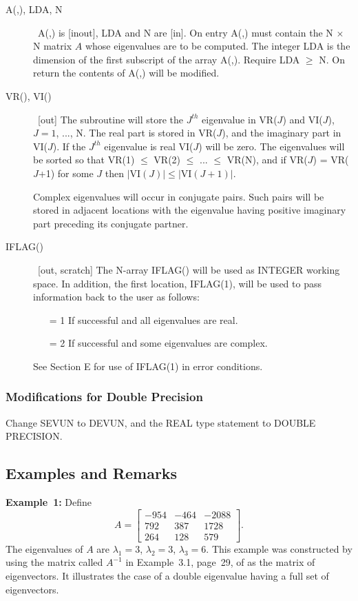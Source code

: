 \documentclass[twoside]{MATH77}
\begin{document}
\begin{description}
\item[A(,), LDA, N]  \ A(,) is [inout], LDA and N are [in]. On entry A(,) must
contain the N $\times $ N matrix $A$ whose eigenvalues are to be computed. The
integer LDA is the dimension of the first subscript of the array A(,).
Require LDA $\geq $ N. On return the contents of A(,) will be modified.

\item[VR(), VI()]  \ [out] The subroutine will store the $J^{th}$ eigenvalue
in VR($J$) and VI($J$), $J =1$, ..., N. The real part is stored in
VR($J$), and
the imaginary part in VI($J$). If the $J^{th}$ eigenvalue is real VI($J$) will
be zero. The eigenvalues will be sorted so that VR(1) $\leq $ VR(2) $\leq $
... $\leq $ VR(N), and if VR($J$) = VR($J$+1) for some $J$ then $|$VI$(J)|
\leq |$VI$(J+1)|.$

Complex eigenvalues will occur in conjugate pairs. Such pairs will be stored
in adjacent locations with the eigenvalue having positive imaginary part
preceding its conjugate partner.

\item[IFLAG()]  \ [out, scratch] The N-array IFLAG() will be used as INTEGER
working space. In addition, the first location, IFLAG(1), will be used to
pass information back to the user as follows:

\begin{itemize}
\item[= 1]  If successful and all eigenvalues are real.

\item[= 2]  If successful and some eigenvalues are complex.
\end{itemize}

See Section E for use of IFLAG(1) in error conditions.
\end{description}

\subsubsection{Modifications for Double Precision}

Change SEVUN to DEVUN, and the REAL type statement to DOUBLE PRECISION.

\subsection{Examples and Remarks}

{\bf Example~1:} Define
\begin{equation*}
A=\left[
\begin{array}{rrr}
-954 & -464 & -2088 \\
792 & 387 & 1728 \\
264 & 128 & 579
\end{array}
\right] .
\end{equation*}
The eigenvalues of $A$ are $\lambda _1 = 3$, $\lambda _2 = 3$, $\lambda _3
= 6$.  This example was constructed by using the matrix called $A^{-1}$ in
Example~3.1, page~29, of \cite{Gregory:1969:ACM} as the matrix of
eigenvectors.  It illustrates the case of a double eigenvalue having a
full set of eigenvectors.
\end{document}

